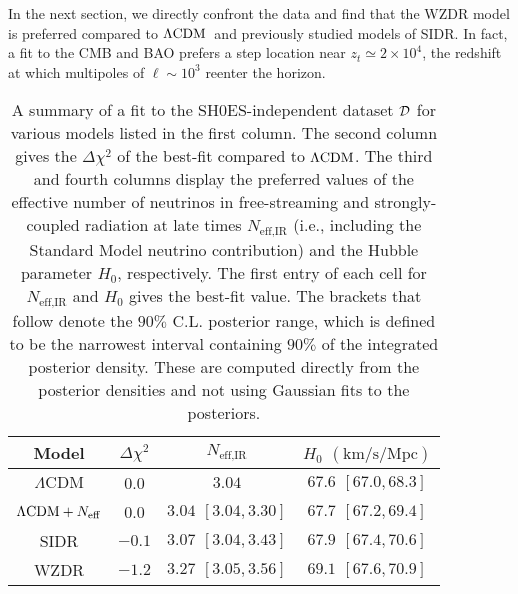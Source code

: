 \documentclass[aps,prd,twocolumn,nofootinbib,superscriptaddress]{revtex4}
\newcommand{\D}{\cal{D}}
\newcommand{\ksm}{\text{km} / \text{s} / \text{Mpc}}
\newcommand{\zt}{z_t}
\def\lcdm{$\Lambda{\rm CDM}$}
\newcommand{\Neff}{N_{\rm eff}}
\begin{document}
In the next section, we directly confront the data and find that the WZDR model is preferred compared to \lcdm\  and previously studied models of SIDR. In fact, a fit to the CMB and BAO prefers a step location near $\zt \simeq 2 \times 10^4$, the redshift at which multipoles of $\ell \sim 10^3$ reenter the horizon. 

\begin{table}[t!]
\setlength\extrarowheight{3pt}
\centering
\begin{tabular}{|c || c | c | c |} 
\hline
Model& $\Delta \chi^2$ & $N_\text{eff,IR}$ & $H_0$ $(\ksm)$  \\
\hline \hline
$\text{$\Lambda$CDM}$ & 0.0 & $3.04 $ & $67.6 ~\, [67.0,68.3]$ \\  \hline
$\text{$\Lambda$CDM} + \Neff$ & 0.0 & $3.04 ~\, [3.04,3.30]$ & $67.7 ~\, [67.2,69.4]$ \\  \hline
SIDR & $-0.1$ & $3.07 ~\, [3.04,3.43]$ & $67.9 ~\, [67.4, 70.6]$\\ \hline
WZDR & $-1.2$ & $3.27 ~\, [3.05,3.56]$ & $69.1 ~\, [67.6,70.9]$ \\
 \hline
\end{tabular}
\caption{A summary of a fit to the SH0ES-independent dataset $\D$ for various models listed in the first column. The second column gives the $\Delta \chi^2$ of the best-fit compared to  \lcdm. The third and fourth columns display the preferred values of the effective number of neutrinos in free-streaming and strongly-coupled radiation at late times $N_\text{eff,IR}$  (i.e., including the Standard Model neutrino contribution) and the Hubble parameter $H_0$, respectively. The first entry of each cell for $N_\text{eff,IR}$ and $H_0$ gives the best-fit value. The brackets that follow denote the $90\%$ C.L. posterior range, which is defined to be the narrowest interval containing $90\%$ of the integrated posterior density. These are computed directly from the posterior densities and not using Gaussian fits to the posteriors.}
\label{tb:minitab1}
\end{table}
\end{document}
